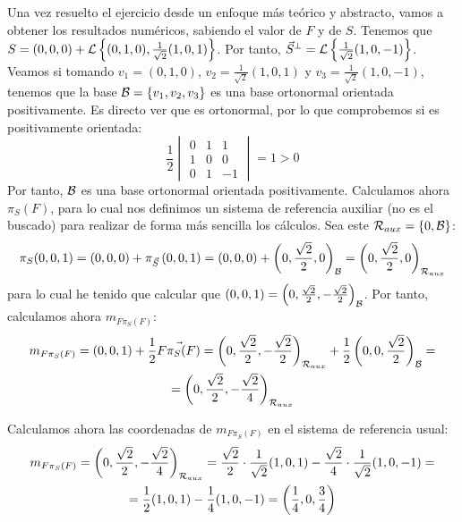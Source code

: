 \documentclass[12pt]{article}
\begin{document}
\begin{ejercicio}[2.5 puntos]
    Una vez resuelto el ejercicio desde un enfoque más teórico y abstracto, vamos a obtener los resultados numéricos, sabiendo el valor de $F$ y de $S$.
    Tenemos que $S=(0,0,0) + \mathcal{L}\left\{(0,1,0), \frac{1}{\sqrt{2}}(1,0,1)\right\}$. Por tanto, $\vec{S}^\perp=\mathcal{L}\left\{\frac{1}{\sqrt{2}}(1,0,-1)\right\}$.
    Veamos si tomando $v_1=(0,1,0)$, $v_2=\frac{1}{\sqrt{2}}(1,0,1)$ y $v_3=\frac{1}{\sqrt{2}}(1,0,-1)$, tenemos que la base $\mathcal{B}=\{v_1,v_2,v_3\}$ es una base ortonormal orientada positivamente.
    Es directo ver que es ortonormal, por lo que comprobemos si es positivamente orientada:
    \begin{equation*}
        \frac{1}{2}\begin{vmatrix}
            0 & 1 & 1 \\
            1 & 0 & 0 \\
            0 & 1 & -1
        \end{vmatrix} = 1 > 0
    \end{equation*}
    Por tanto, $\mathcal{B}$ es una base ortonormal orientada positivamente. Calculamos ahora $\pi_S(F)$, para lo cual nos definimos un sistema de referencia auxiliar (no es el buscado) para
    realizar de forma más sencilla los cálculos. Sea este $\mathcal{R}_{aux}=\{0,\mathcal{B}\}$:
    \begin{equation*}
        \pi_S(0,0,1) = (0,0,0) + \pi_{\vec{S}} \left(0,0,1\right) = (0,0,0) + \left(0, \frac{\sqrt{2}}{2}, 0\right)_{\mathcal{B}} = \left(0, \frac{\sqrt{2}}{2}, 0\right)_{\mathcal{R}_{aux}}
    \end{equation*}
    para lo cual he tenido que calcular que $(0,0,1)=\left(0, \frac{\sqrt{2}}{2}, -\frac{\sqrt{2}}{2}\right)_{\mathcal{B}}$. Por tanto, calculamos ahora $m_{F \pi_S(F)}$:
    \begin{multline*}
        m_{F \pi_S(F)} = (0,0,1) + \frac{1}{2}\vec{F\pi_S(F)} = \left(0, \frac{\sqrt{2}}{2}, -\frac{\sqrt{2}}{2}\right)_{\mathcal{R}_{aux}} + \frac{1}{2}\left(0, 0, \frac{\sqrt{2}}{2}\right)_{\mathcal{B}} =\\= \left(0, \frac{\sqrt{2}}{2}, -\frac{\sqrt{2}}{4}\right)_{\mathcal{R}_{aux}}
    \end{multline*}

    Calculamos ahora las coordenadas de $m_{F \pi_S(F)}$ en el sistema de referencia usual:
    \begin{multline*}
        m_{F \pi_S(F)} = \left(0, \frac{\sqrt{2}}{2}, -\frac{\sqrt{2}}{4}\right)_{\mathcal{R}_{aux}}
        = \frac{\sqrt{2}}{2}\cdot \frac{1}{\sqrt{2}}(1,0,1) - \frac{\sqrt{2}}{4}\cdot \frac{1}{\sqrt{2}}(1,0,-1)
        =\\= \frac{1}{2}(1,0,1) - \frac{1}{4}(1,0,-1) = \left(\frac{1}{4}, 0, \frac{3}{4}\right)
    \end{multline*}


\end{ejercicio}
\end{document}
